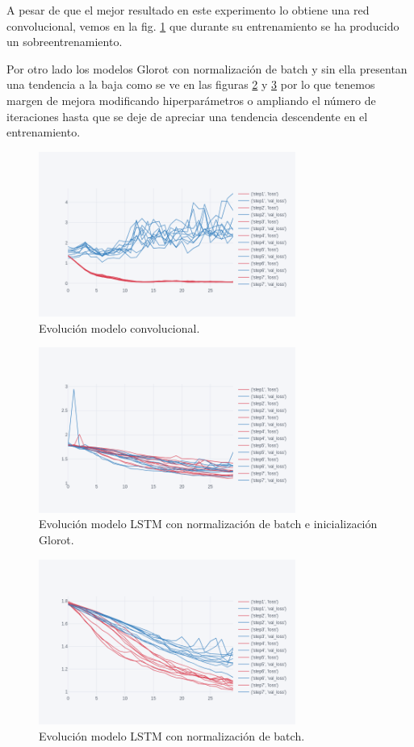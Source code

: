 A pesar de que el mejor resultado en este experimento lo obtiene una red convolucional, vemos en la fig. \ref{conv-5} que durante su entrenamiento se ha producido un sobreentrenamiento.

Por otro lado los modelos Glorot con normalización de batch y sin ella presentan una tendencia a la baja como se ve en las figuras \ref{go-5} y \ref{gn-5} por lo que tenemos margen de mejora modificando hiperparámetros o ampliando el número de iteraciones hasta que se deje de apreciar una tendencia descendente en el entrenamiento.


\begin{figure}[H]
	\centering
	\includegraphics[width=0.75\textwidth]{imaxes/conv-5-clases.png}
	\caption{Evolución modelo convolucional.}
	\label{conv-5}
\end{figure}

\begin{figure}[H]
	\centering
	\includegraphics[width=0.75\textwidth]{imaxes/go.png}
	\caption{Evolución modelo LSTM con normalización de batch e inicialización Glorot.}
	\label{go-5}
\end{figure}

\begin{figure}[H]
	\centering
	\includegraphics[width=0.75\textwidth]{imaxes/gnbn.png}
	\caption{Evolución modelo LSTM con normalización de batch.}
	\label{gn-5}
\end{figure}


